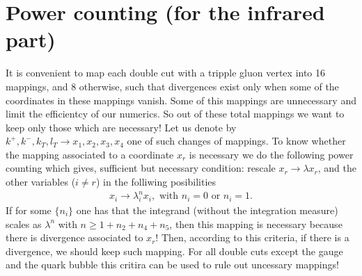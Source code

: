 \documentclass[a4paper,11pt]{article}
\numberwithin{equation}{section}
\newcommand{\kp}{k_+}
\newcommand{\lp}{l_+}
\begin{document}
% 
%

\section{Power counting (for the infrared part)}

It is convenient to map each double cut
with a tripple gluon vertex into 16 mappings, and 8 otherwise, such that divergences exist only when some of the 
coordinates in these mappings vanish. Some of this mappings are
unnecessary and limit the efficientcy of our numerics. So out of these total mappings we want to keep only those which are necessary! Let us denote by $k^+,k^-,k_T,l_T \to{x_1,x_2,x_3,x_4}$ one of such changes of mappings. To know whether the mapping associated to a coordinate $x_r$ is necessary we do the following  power counting which gives, sufficient but necessary condition:
rescale $x_r\to\lambda x_r$, and the other variables 
($i\ne r$) in the folliwing posibilities
\begin{align}
x_i\to\lambda^n_i x_i,  \text{ with } n_i=0 \text{ or } n_i=1.
\end{align}
If for some $\{n_i\}$ one has 
that the integrand (without the integration measure) scales as $\lambda^n$ with $n\ge 1+n_2+n_4+n_5$, then this mapping is necessary because there is divergence associated to $x_r$! Then, according to this criteria, if there is a divergence, we should keep such mapping. For all double
cuts except the gauge and the quark bubble this critira
can be used to rule out uncessary mappings!
\end{document}
